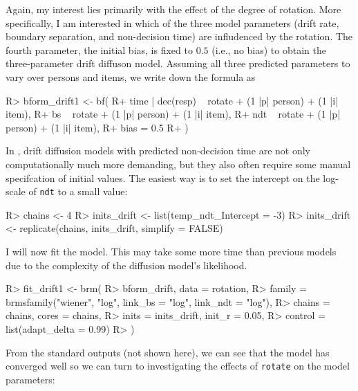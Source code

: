 \documentclass[
]{jss}
\begin{document}
Again, my interest lies primarily with the effect of the degree of
rotation. More specifically, I am interested in which of the three model
parameters (drift rate, boundary separation, and non-decision time) are
infludenced by the rotation. The fourth parameter, the initial bias, is
fixed to \(0.5\) (i.e., no bias) to obtain the three-parameter drift
diffuson model. Assuming all three predicted parameters to vary over
persons and items, we write down the formula as

\begin{CodeChunk}

\begin{CodeInput}
R> bform_drift1 <- bf(
R+   time | dec(resp) ~ rotate + (1 |p| person) + (1 |i| item),
R+   bs ~ rotate + (1 |p| person) + (1 |i| item),
R+   ndt ~ rotate + (1 |p| person) + (1 |i| item),
R+   bias = 0.5
R+ )
\end{CodeInput}
\end{CodeChunk}

In , drift diffusion models with predicted non-decision
time are not only computationally much more demanding, but they also
often require some manual specifcation of initial values. The easiest
way is to set the intercept on the log-scale of \texttt{ndt} to a small
value:

\begin{CodeChunk}

\begin{CodeInput}
R> chains <- 4
R> inits_drift <- list(temp_ndt_Intercept = -3)
R> inits_drift <- replicate(chains, inits_drift, simplify = FALSE)
\end{CodeInput}
\end{CodeChunk}

I will now fit the model. This may take some more time than previous
models due to the complexity of the diffusion model's likelihood.

\begin{CodeChunk}

\begin{CodeInput}
R> fit_drift1 <- brm(
R>   bform_drift, data = rotation, 
R>   family = brmsfamily("wiener", "log", link_bs = "log", link_ndt = "log"),
R>   chains = chains, cores = chains,
R>   inits = inits_drift, init_r = 0.05,
R>   control = list(adapt_delta = 0.99)
R> )
\end{CodeInput}
\end{CodeChunk}

From the standard outputs (not shown here), we can see that the model
has converged well so we can turn to investigating the effects of
\texttt{rotate} on the model parameters:
\end{document}
